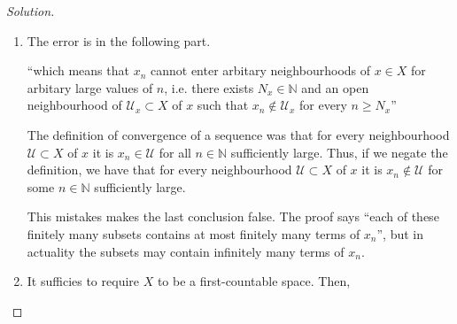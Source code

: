 \documentclass[a4paper]{article}
\theoremstyle{definition}
\begin{document}
\begin{proof}[Solution]
    \begin{enumerate}
        \item The error is in the following part.
    
        ``which means that \(x_n\) {\color{red}cannot enter} arbitary neighbourhoods of \(x \in X\) for arbitary large values of \(n\), i.e. there exists \(N_x \in \mathbb{N}\) and an open neighbourhood of \(\mathcal{U}_x \subset X\) of \(x\) such that \(x_n \not\in \mathcal{U}_x\) {\color{red}for every} \(n \geq N_x\)''
    
        The definition of convergence of a sequence was that for every neighbourhood \(\mathcal{U} \subset X\) of \(x\) it is \(x_n \in \mathcal{U}\) for all \(n \in \mathbb{N}\) sufficiently large. Thus, if we negate the definition, we have that for every neighbourhood \(\mathcal{U} \subset X\) of \(x\) it is \(x_n \not\in \mathcal{U}\) {\color{red}for some} \(n \in \mathbb{N}\) sufficiently large.
    
        This mistakes makes the last conclusion false. The proof says ``each of these finitely many subsets contains at most finitely many terms of \(x_n\)'', but in actuality the subsets may contain infinitely many terms of \(x_n\).
        \item It sufficies to require \(X\) to be a first-countable space. Then, 
    \end{enumerate}
\end{proof}
\end{document}
